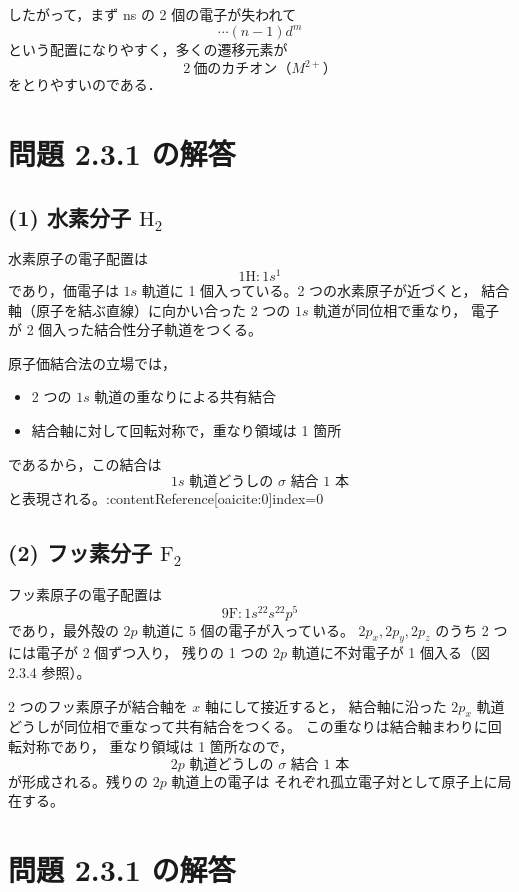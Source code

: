 \documentclass[a4paper,12pt]{jlreq}
\begin{document}
したがって，まず ns の 2 個の電子が失われて
\[
\cdots (n-1)d^{m}
\]
という配置になりやすく，多くの遷移元素が
\[
\boxed{2\ \text{価のカチオン}（M^{2+}）}
\]
をとりやすいのである．


\newpage

\section*{問題 2.3.1 の解答}

\subsection*{(1) 水素分子 \(\mathrm{H_2}\)}

水素原子の電子配置は
\[
1\mathrm{H}: 1s^1
\]
であり，価電子は \(1s\) 軌道に 1 個入っている。2 つの水素原子が近づくと，
結合軸（原子を結ぶ直線）に向かい合った 2 つの \(1s\) 軌道が同位相で重なり，
電子が 2 個入った結合性分子軌道をつくる。

原子価結合法の立場では，
\begin{itemize}
  \item 2 つの \(1s\) 軌道の重なりによる共有結合
  \item 結合軸に対して回転対称で，重なり領域は 1 箇所
\end{itemize}
であるから，この結合は
\[
\boxed{\text{\(1s\) 軌道どうしの \(\sigma\) 結合 1 本}}
\]
と表現される。:contentReference[oaicite:0]{index=0}

\subsection*{(2) フッ素分子 \(\mathrm{F_2}\)}

フッ素原子の電子配置は
\[
9\mathrm{F}: 1s^22s^22p^5
\]
であり，最外殻の \(2p\) 軌道に 5 個の電子が入っている。
\(2p_x,2p_y,2p_z\) のうち 2 つには電子が 2 個ずつ入り，
残りの 1 つの \(2p\) 軌道に不対電子が 1 個入る（図 2.3.4 参照）。

2 つのフッ素原子が結合軸を \(x\) 軸にして接近すると，
結合軸に沿った \(2p_x\) 軌道どうしが同位相で重なって共有結合をつくる。
この重なりは結合軸まわりに回転対称であり，
重なり領域は 1 箇所なので，
\[
\boxed{\text{\(2p\) 軌道どうしの \(\sigma\) 結合 1 本}}
\]
が形成される。残りの \(2p\) 軌道上の電子は
それぞれ孤立電子対として原子上に局在する。

\section*{問題 2.3.1 の解答}
\end{document}
